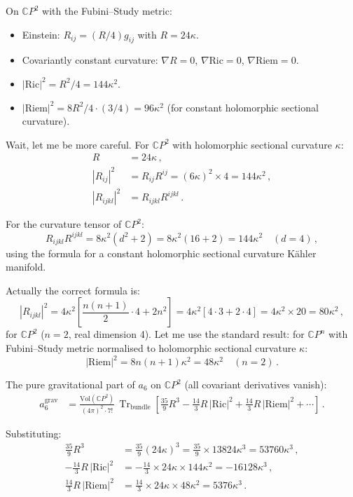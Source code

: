 \documentclass[11pt,a4paper]{article}
\newcommand{\Tr}{\operatorname{Tr}}
\newcommand{\CP}{\mathbb{C}P}
\begin{document}
On $\CP^2$ with the Fubini--Study metric:
\begin{itemize}
\item Einstein: $R_{ij} = (R/4)g_{ij}$ with $R = 24\kappa$.
\item Covariantly constant curvature: $\nabla R = 0$, $\nabla\mathrm{Ric} = 0$, $\nabla\mathrm{Riem} = 0$.
\item $|\mathrm{Ric}|^2 = R^2/4 = 144\kappa^2$.
\item $|\mathrm{Riem}|^2 = 8R^2/4 \cdot (3/4) = 96\kappa^2$ (for constant holomorphic sectional curvature).
\end{itemize}

Wait, let me be more careful. For $\CP^2$ with holomorphic sectional curvature $\kappa$:
\begin{align}
R &= 24\kappa\,, \\
|R_{ij}|^2 &= R_{ij}R^{ij} = (6\kappa)^2 \times 4 = 144\kappa^2\,, \\
|R_{ijkl}|^2 &= R_{ijkl}R^{ijkl}\,.
\end{align}

For the curvature tensor of $\CP^2$:
\begin{equation}
R_{ijkl}R^{ijkl} = 8\kappa^2(d^2 + 2) = 8\kappa^2(16 + 2) = 144\kappa^2 \quad (d = 4)\,,
\end{equation}
using the formula for a constant holomorphic sectional curvature K\"ahler manifold.

Actually the correct formula is:
\begin{equation}
|R_{ijkl}|^2 = 4\kappa^2\left[\frac{n(n+1)}{2} \cdot 4 + 2n^2\right] = 4\kappa^2\left[4 \cdot 3 + 2 \cdot 4\right] = 4\kappa^2 \times 20 = 80\kappa^2\,,
\end{equation}
for $\CP^2$ ($n = 2$, real dimension 4). Let me use the standard result: for $\CP^n$ with Fubini--Study metric normalised to holomorphic sectional curvature $\kappa$:
\begin{equation}
|\mathrm{Riem}|^2 = 8n(n+1)\kappa^2 = 48\kappa^2 \quad (n = 2)\,.
\end{equation}

The pure gravitational part of $a_6$ on $\CP^2$ (all covariant derivatives vanish):
\begin{align}
a_6^{\mathrm{grav}} &= \frac{\mathrm{Vol}(\CP^2)}{(4\pi)^2 \cdot 7!}\,\Tr_{\mathrm{bundle}}\left[\frac{35}{9}R^3 - \frac{14}{3}R\,|\mathrm{Ric}|^2 + \frac{14}{3}R\,|\mathrm{Riem}|^2 + \cdots\right]\,.
\end{align}

Substituting:
\begin{align}
\frac{35}{9}R^3 &= \frac{35}{9}(24\kappa)^3 = \frac{35}{9} \times 13824\kappa^3 = 53760\kappa^3\,, \\
-\frac{14}{3}R\,|\mathrm{Ric}|^2 &= -\frac{14}{3} \times 24\kappa \times 144\kappa^2 = -16128\kappa^3\,, \\
\frac{14}{3}R\,|\mathrm{Riem}|^2 &= \frac{14}{3} \times 24\kappa \times 48\kappa^2 = 5376\kappa^3\,.
\end{align}
\end{document}
